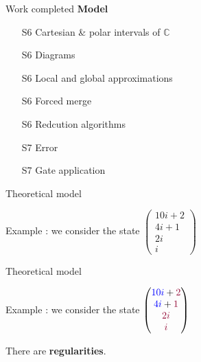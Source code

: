 \begin{frame}{Work completed}
  \textbf{Model}
  \begin{itemize}
      \item[S6] Cartesian \& polar intervals of $\mathbb C$
      \item[S6] Diagrams
      \item[S6] Local and global approximations
      \item[S6] Forced merge
      \item[S6] Redcution algorithms
      \item[S7] Error
      \item[S7] Gate application
  \end{itemize}
\end{frame}

\begin{frame}{Theoretical model}

  Example : we consider the state $\begin{pmatrix}
    10i+2 \\ 4i+1 \\ 2i \\ i
  \end{pmatrix}$

  \vspace{2em}

\end{frame}

\begin{frame}[noframenumbering]{Theoretical model} %

  Example : we consider the state $\begin{pmatrix}
  \color{blue}10i \color{black} + \color{cs} 2 \\
  \color{blue}4i  \color{black} + \color{cs} 1 \\
  \color{cs}  2i \\
  \color{cs}  i
  \end{pmatrix}$

  \vspace{1em}
  There are \textbf{regularities}.
\end{frame}

